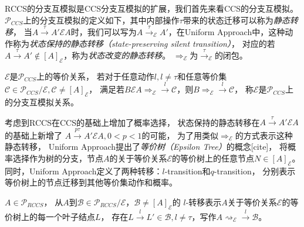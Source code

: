    RCCS的分支互模拟是CCS分支互模拟的扩展，我们首先来看CCS的分支互模拟。
   $\mathcal{P}_{CCS}$上的分支互模拟的定义如下，其中内部操作$\tau$带来的状态迁移可以称为\textit{静态转移}，
   当$A\stackrel{\tau}{\rightarrow}A'\mathcal{E}A$时，我们可以写为$A\stackrel{\tau}{\rightarrow}_{\mathcal{E}}A'$，在Uniform Approach中，这种动作称为\textit{状态保持的静态转移（state-preserving silent transition）}，
   对应的若$A\stackrel{\tau}{\rightarrow}A'\notin [A]_{\mathcal{E}}$，称为\textit{状态改变的静态转移}。
   $\Rightarrow_{\mathcal{E}}$为$\stackrel{\tau}{\rightarrow}_{\mathcal{E}}$的闭包。
   \begin{definition}
      $\mathcal{E}$是$\mathcal{P}_{CCS}$上的等价关系，
      若对于任意动作$l,l\neq \tau$和任意等价集$\mathcal{C}\in \mathcal{P}_{CCS}/\mathcal{E}, \mathcal{C}\neq [A]_{\mathcal{E}}$，
      满足若$B\mathcal{E}A\Rightarrow_{\mathcal{E}}\stackrel{l}{\rightarrow}\mathcal{C}$，则$B\Rightarrow_{\mathcal{E}}\stackrel{l}{\rightarrow}\mathcal{C}$，
      称$\mathcal{E}$是$\mathcal{P}_{CCS}$上的分支互模拟关系。
   \end{definition}

   考虑到RCCS在CCS的基础上增加了概率选择，
   状态保持的静态转移在$A\stackrel{\tau}{\rightarrow}A'\mathcal{E}A$的基础上新增了
   $A\stackrel{p\tau}{\rightarrow} A'\mathcal{E}A,0<p<1$的可能，
   为了用类似$\Rightarrow_{\mathcal{E}}$的方式表示这种静态转移，
   Uniform Approach提出了\textit{等价树（Epsilon Tree）}的概念[cite]，
   将概率选择作为树的分支，节点$A$的关于等价关系$\mathcal{E}$的等价树上的任意节点$N\in [A]_{\mathcal{E}}$。
   同时，Uniform Approach定义了两种转移：$l$-transition和$q$-transition，
   分别表示等价树上的节点迁移到其他等价集动作和概率。

   \begin{definition}[$l$-转移($l$-transition)]
      $A\in \mathcal{P}_{RCCS}$，
      从$A$到$\mathcal{B}\in \mathcal{P}_{RCCS}/\mathcal{E}，\mathcal{B}\neq [A]_{\mathcal{E}}$的
      $l$-转移表示$A$关于等价关系$\mathcal{E}$的等价树上的每一个叶子结点$L$，
      存在$L\stackrel{l}{\rightarrow}L'\in\mathcal{B},l\neq \tau$，写作$A\rightsquigarrow_{\mathcal{E}}\stackrel{l}{\rightarrow}\mathcal{B}$。
   \end{definition}

